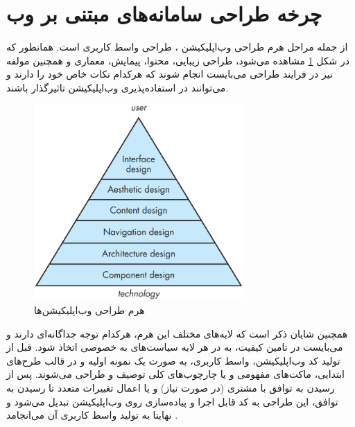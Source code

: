 \section{چرخه طراحی سامانه‌های مبتنی بر وب}
از جمله مراحل هرم طراحی وب‌اپلیکیشن
\cite{pressman_software_2015}،
طراحی واسط کاربری است.  همانطور که در شکل
\ref{fig:pyramid}
مشاهده می‌شود، طراحی زیبایی، محتوا، پیمایش، معماری و همچنین مولفه نیز در فرایند طراحی می‌بایست انجام شوند که هرکدام نکات خاص خود را دارند و می‌توانند در استفاده‌پذیری وب‌اپلیکیشن تاثیرگذار باشند.
\begin{figure}[H]
	\centering\includegraphics[width=8cm]{Resources/pyramid.PNG}
	\caption{هرم طراحی وب‌اپلیکیشن‌ها
		\cite{pressman_software_2015}
	}
	\label{fig:pyramid}
\end{figure}
همچنین شایان ذکر است که لایه‌های مختلف این هرم، هرکدام توجه جداگانه‌ای دارند و می‌بایست در تامین کیفیت، به در هر لایه سیاست‌های به خصوصی اتخاذ شود. قبل از تولید کد وب‌اپلیکیشن، واسط کاربری، به صورت یک نمونه اولیه و در قالب طرح‌های ابتدایی، ماکت‌های مفهومی و یا چارچوب‌های کلی توصیف و طراحی می‌شوند. پس از رسیدن به توافق با مشتری (در صورت نیاز) و یا اعمال تغییرات متعدد تا رسیدن به توافق، این طراحی به کد قابل اجرا و پیاده‌سازی روی وب‌اپلیکیشن تبدیل می‌شود و نهایتا به تولید واسط کاربری آن می‌انجامد
\cite{sommerville_software_2016}.

